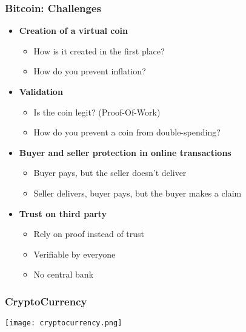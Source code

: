 \begin{frame}
    \frametitle{Bitcoin: Challenges}
    \begin{itemize}
        \item \textbf{Creation of a virtual coin}
            \begin{itemize}
                \item How is it created in the first place?
                \item How do you prevent inflation?
            \end{itemize}
        \item \textbf{Validation}
            \begin{itemize}
                \item Is the coin legit? \alert{(Proof-Of-Work)}
                \item How do you prevent a coin from \alert{double-spending}?
            \end{itemize}
        \item \textbf{Buyer and seller protection in online transactions}
            \begin{itemize}
                \item Buyer pays, but the seller doesn't deliver
                \item Seller delivers, buyer pays, but the buyer makes a claim
            \end{itemize}
        \item \textbf{Trust on third party}
            \begin{itemize}
                \item Rely on proof instead of trust
                \item Verifiable by everyone
                \item No central bank
            \end{itemize}
    \end{itemize}
\end{frame}

\begin{frame}
    \frametitle{CryptoCurrency}
    \texttt{[image: cryptocurrency.png]}
\end{frame}

